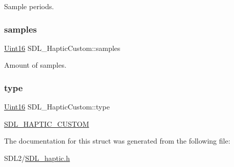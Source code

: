 Sample periods. \mbox{\label{struct_s_d_l___haptic_custom_a5905ea1b6182da846535ca8c80b4fa33}} 
\subsubsection{\texorpdfstring{samples}{samples}}
{\footnotesize\ttfamily \hyperlink{_s_d_l__stdinc_8h_a31fcc0a076c9068668173ee26d33e42b}{Uint16} S\+D\+L\+\_\+\+Haptic\+Custom\+::samples}

Amount of samples. \mbox{\label{struct_s_d_l___haptic_custom_a98a8995c94492069dc007502ed97eed2}} 
\subsubsection{\texorpdfstring{type}{type}}
{\footnotesize\ttfamily \hyperlink{_s_d_l__stdinc_8h_a31fcc0a076c9068668173ee26d33e42b}{Uint16} S\+D\+L\+\_\+\+Haptic\+Custom\+::type}

\hyperlink{_s_d_l__haptic_8h_a8a18c4de1076ac9bebd718329d16db29}{S\+D\+L\+\_\+\+H\+A\+P\+T\+I\+C\+\_\+\+C\+U\+S\+T\+OM} 

The documentation for this struct was generated from the following file\+:\begin{DoxyCompactItemize}
\item 
S\+D\+L2/\hyperlink{_s_d_l__haptic_8h}{S\+D\+L\+\_\+haptic.\+h}\end{DoxyCompactItemize}
